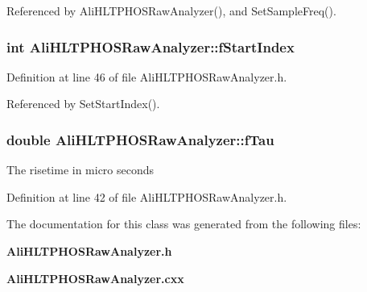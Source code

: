 Referenced by Ali\-HLTPHOSRaw\-Analyzer(), and Set\-Sample\-Freq().
\subsubsection{\setlength{\rightskip}{0pt plus 5cm}int {\bf Ali\-HLTPHOSRaw\-Analyzer::f\-Start\-Index}\hspace{0.3cm}{\tt  [protected]}}\label{classAliHLTPHOSRawAnalyzer_AliHLTPHOSRawAnalyzerPeakFinderp7}




Definition at line 46 of file Ali\-HLTPHOSRaw\-Analyzer.h.

Referenced by Set\-Start\-Index().
\subsubsection{\setlength{\rightskip}{0pt plus 5cm}double {\bf Ali\-HLTPHOSRaw\-Analyzer::f\-Tau}\hspace{0.3cm}{\tt  [protected]}}\label{classAliHLTPHOSRawAnalyzer_AliHLTPHOSRawAnalyzerPeakFinderp4}


The risetime in micro seconds 

Definition at line 42 of file Ali\-HLTPHOSRaw\-Analyzer.h.

The documentation for this class was generated from the following files:\begin{CompactItemize}
\item 
{\bf Ali\-HLTPHOSRaw\-Analyzer.h}\item 
{\bf Ali\-HLTPHOSRaw\-Analyzer.cxx}\end{CompactItemize}
